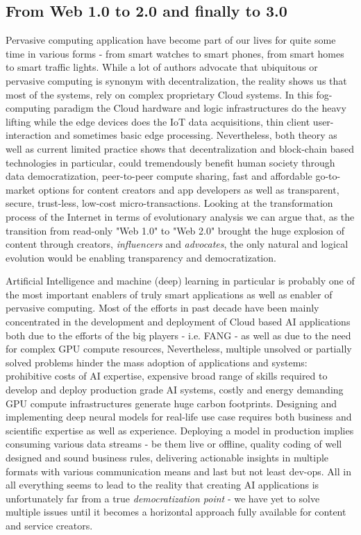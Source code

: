 \documentclass{article}
\begin{document}
\subsection{From Web 1.0 to 2.0 and finally to 3.0}
Pervasive computing application have become part of our lives for quite some time in various forms - from smart watches to smart phones, from smart homes to smart traffic lights. While a lot of authors advocate that ubiquitous or pervasive computing \cite{hansmann2003pervasive} \cite{conti2012looking} \cite{hansmann2013pervasive} is synonym with decentralization, the reality shows us that most of the systems, rely on complex proprietary Cloud systems. In this fog-computing\cite{chan2017fog} paradigm the Cloud hardware and logic infrastructures do the heavy lifting while the edge devices does the IoT data acquisitions, thin client user-interaction and sometimes basic edge processing. Nevertheless, both theory as well as current limited practice shows that decentralization \cite{voshmgir2019token} \cite{sunyaev2021token} and block-chain based technologies \cite{nofer2017blockchain} \cite{zheng2018blockchain} \cite{monrat2019survey} in particular, could tremendously benefit human society through data democratization, peer-to-peer compute sharing, fast and affordable go-to-market options for content creators and app developers as well as transparent, secure, trust-less, low-cost micro-transactions. Looking at the transformation process of the Internet in terms of evolutionary analysis we can argue that, as the transition from read-only "Web 1.0" to "Web 2.0" brought the huge explosion of content through creators, \emph{influencers} and \emph{advocates}, the only natural and logical evolution would be enabling transparency and democratization. 

Artificial Intelligence and machine (deep) learning in particular is probably one of the most important enablers of truly smart applications as well as enabler of pervasive computing. Most of the efforts in past decade have been mainly concentrated in the development and deployment of Cloud based AI applications both due to the efforts of the big players - i.e. FANG\cite{pisal2021rise} - as well as due to the need for complex GPU compute resources, Nevertheless, multiple  unsolved or partially solved problems hinder the mass adoption of applications and systems: prohibitive costs of AI expertise, expensive broad range of skills required to develop and deploy production grade AI systems, costly and energy demanding GPU compute infrastructures generate huge carbon footprints. Designing and implementing deep neural models for real-life use case  requires both business and scientific expertise as well as experience. Deploying a model in production implies consuming various data streams - be them live or offline, quality coding of well designed and sound business rules, delivering actionable insights in multiple formats with various communication means and last but not least dev-ops. All in all everything seems to lead to the reality that creating AI applications is unfortunately far from a true \emph{democratization point} - we have yet to solve multiple issues until it becomes a horizontal approach fully available for content and service creators. 
\end{document}
